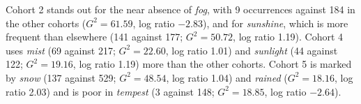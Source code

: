 \documentclass[11pt]{article}
\begin{document}
Cohort 2 stands out for the near absence of \emph{fog}, with 9 occurrences against 184 in the other cohorts ($G^2=61.59$, log ratio $-2.83$), and for \emph{sunshine}, which is more frequent than elsewhere (141 against 177; $G^2=50.72$, log ratio 1.19).
Cohort 4 uses \emph{mist} (69 against 217; $G^2=22.60$, log ratio 1.01) and \emph{sunlight} (44 against 122; $G^2=19.16$, log ratio 1.19) more than the other cohorts.
Cohort 5 is marked by \emph{snow} (137 against 529; $G^2=48.54$, log ratio 1.04) and \emph{rained} ($G^2=18.16$, log ratio 2.03) and is poor in \emph{tempest} (3 against 148; $G^2=18.85$, log ratio $-2.64$).
\end{document}
